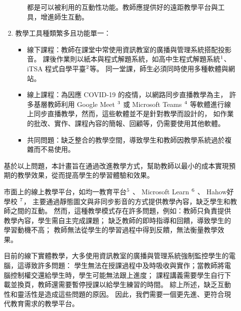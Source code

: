 \documentclass[12pt]{article}
\begin{document}
\begin{enumerate}
\begin{enumerate}
\begin{itemize}
          都是可以被利用的互動性功能。教師應提供好的遠距教學平台與工具，增進師生互動\cite{ref4}。
        \end{itemize}
      \item 教學工具種類繁多且功能單一：
        \begin{itemize}
          \item 線下課程：教師在課堂中常使用資訊教室的廣播與管理系統搭配投影音。
          課後作業則以紙本與程式解題系統，如高中生程式解題系統$\footnote{https://zerojudge.tw/}$、
           iTSA 程式自學平臺$\footnote{https://e-tutor.itsa.org.tw/e-Tutor/}$等。
          同一堂課，師生必須同時使用多種軟體與網站。
          \item 線上課程：為因應 COVID-19 的疫情，以網路同步直播教學為主，
          許多基層教師利用 Google Meet $\footnote{https://meet.google.com/}$
          或 Microsoft Teams $\footnote{https://www.microsoft.com/zh-tw/microsoft-teams/}$
          等軟體進行線上同步直播教學，然而，這些軟體並不是針對教學而設計的，
          如作業的批改、實作、課程內容的簡報、回顧等，仍需要使用其他軟體。
          \item 共同問題：缺乏整合的教學空間，導致學生和教師因教學系統過於複雜而不易使用。
        \end{itemize}
    \end{enumerate}
    \par 基於以上問題，本計畫旨在通過改進教學方式，幫助教師以最小的成本實現預期的教學效果，從而提高學生的學習體驗和效果。
    
    \par 市面上的線上教學平台，如均一教育平台$\footnote{https://www.junyiacademy.org/}$
    、 Microsoft Learn $\footnote{https://learn.microsoft.com/zh-tw/}$
    、 Hahow好學校 $\footnote{https://hahow.in/}$，
    主要通過靜態圖文與非同步影音的方式提供教學內容，缺乏學生和教師之間的互動。
    然而，這種教學模式存在許多問題，例如：教師只負責提供教學內容，學生需自主完成課題；
    缺乏教師的即時指導和回饋，導致學生的學習動機不高；
    教師無法從學生的學習過程中得到反饋，無法衡量教學效果\cite{ref4}。
    
    \par 目前的線下實體教學，大多使用資訊教室的廣播與管理系統強制監控學生的電腦，這導致許多問題：
    學生無法在授課過程中及時吸收與實作；當教師將電腦控制權交還給學生時，學生可能無法跟上進度；
    課程講義需要學生自行下載並換頁，教師還需要暫停授課以給學生練習的時間。
    綜上所述，缺乏互動性和靈活性是造成這些問題的原因。
    因此，我們需要一個更先進、更符合現代教育需求的教學平台。


\end{enumerate}
\end{document}
